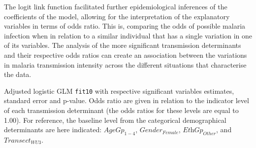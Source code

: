 The logit link function facilitated further epidemiological inferences of the coefficients of the model, allowing for the interpretation of the explanatory variables in terms of odds ratio.
This is, comparing the odds of possible malaria infection when in relation to a similar individual that has a single variation in one of its variables.
The analysis of the more significant transmission determinants and their respective odds ratios can create an association between the variations in malaria transmission intensity across the different situations that characterise the data.
\newpage

\begin{table}[ht!]
\centering
\caption[Adjusted logistic GLM \texttt{fit10}]{Adjusted logistic GLM \texttt{fit10} with respective significant variables estimates, standard error and p-value. Odds ratio are given in relation to the indicator level of each transmission determinant (the odds ratios for these levels are equal to 1.00). For reference, the baseline level from the categorical demographical determinants are here indicated: $\textit{AgeGp}_{1-4}$, $\textit{Gender}_{Female}$, $\textit{EthGp}_{Other}$, and $\textit{Transect}_{WU3}$.}
\label{tab:fit11.glm}
\begin{adjustbox}{width=\linewidth}

\end{adjustbox}
\end{table}

